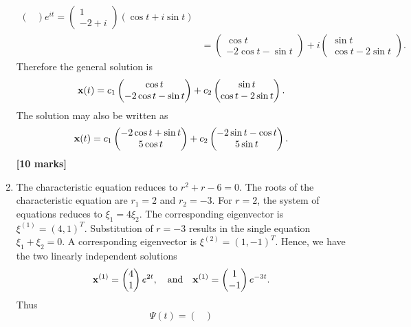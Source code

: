 \documentclass[11pt,a4paper]{article}
\newcommand{\mrk}[1]{\hfill\textbf{[#1 marks]}}
\begin{document}
\begin{enumerate}
\begin{align*}
\begin{pmatrix}
			\end{pmatrix} e^{it} =
			\begin{pmatrix}
				1\\
				-2 + i
			\end{pmatrix}(\cos t + i\sin t)\\
			&=
			\begin{pmatrix}
				\cos t\\
				-2\cos t - \sin t
			\end{pmatrix} + i
			\begin{pmatrix}
				\sin t\\
				\cos t - 2\sin t
			\end{pmatrix}.
		\end{align*}
		Therefore the general solution is
		$$
		\vb{x}(t) = c_1
		\begin{pmatrix}
			\cos t\\
			-2\cos t - \sin t
		\end{pmatrix} + c_2
		\begin{pmatrix}
			\sin t\\
			\cos t - 2\sin t
		\end{pmatrix}.
		$$
		The solution may also be written as
		$$
		\vb{x}(t) = c_1
		\begin{pmatrix}
			-2 \cos t + \sin t\\
			5\cos t
		\end{pmatrix} + c_2
		\begin{pmatrix}
			-2\sin t - \cos t\\
			5\sin t
		\end{pmatrix}.
		$$
		\mrk{10}
		\item The characteristic equation reduces to $r^2 + r - 6 = 0$. The roots of the characteristic equation are $r_1 = 2$ and $r_2 = -3$. For $r = 2$, the system of equations reduces to $\xi_1 = 4\xi_2$. The corresponding eigenvector is $\xi^{(1)} = (4, 1)^T$. Substitution of $r = -3$ results in the single equation $\xi_1 + \xi_2 = 0$. A corresponding eigenvector is $\xi^{(2)} = (1, -1)^T$. Hence, we have the two linearly independent solutions
		$$
		\vb{x}^{(1)} =
		\begin{pmatrix}
			4\\
			1
		\end{pmatrix}e^{2t},\quad\text{and} \quad \vb{x}^{(1)} =
		\begin{pmatrix}
			1\\
			-1
		\end{pmatrix}e^{-3t}.
		$$
		Thus
		$$
		\Psi(t) =
		\begin{pmatrix}

\end{pmatrix}$$
\end{enumerate}
\end{document}
